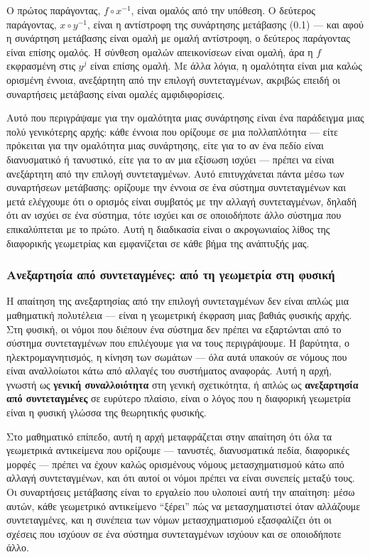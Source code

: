 \documentclass[12pt]{article}
\begin{document}
Ο πρώτος παράγοντας, $f \circ x^{-1}$, είναι ομαλός από την υπόθεση. Ο δεύτερος παράγοντας, $x \circ y^{-1}$, είναι η αντίστροφη της συνάρτησης μετάβασης (0.1) --- και αφού η συνάρτηση μετάβασης είναι ομαλή με ομαλή αντίστροφη, ο δεύτερος παράγοντας είναι επίσης ομαλός. Η σύνθεση ομαλών απεικονίσεων είναι ομαλή, άρα η $f$ εκφρασμένη στις $y^j$ είναι επίσης ομαλή. Με άλλα λόγια, η ομαλότητα είναι μια καλώς ορισμένη έννοια, ανεξάρτητη από την επιλογή συντεταγμένων, ακριβώς επειδή οι συναρτήσεις μετάβασης είναι ομαλές αμφιδιφορίσεις.

Αυτό που περιγράψαμε για την ομαλότητα μιας συνάρτησης είναι ένα παράδειγμα μιας πολύ γενικότερης αρχής: κάθε έννοια που ορίζουμε σε μια πολλαπλότητα --- είτε πρόκειται για την ομαλότητα μιας συνάρτησης, είτε για το αν ένα πεδίο είναι διανυσματικό ή τανυστικό, είτε για το αν μια εξίσωση ισχύει --- πρέπει να είναι ανεξάρτητη από την επιλογή συντεταγμένων. Αυτό επιτυγχάνεται πάντα μέσω των συναρτήσεων μετάβασης: ορίζουμε την έννοια σε ένα σύστημα συντεταγμένων και μετά ελέγχουμε ότι ο ορισμός είναι συμβατός με την αλλαγή συντεταγμένων, δηλαδή ότι αν ισχύει σε ένα σύστημα, τότε ισχύει και σε οποιοδήποτε άλλο σύστημα που επικαλύπτεται με το πρώτο. Αυτή η διαδικασία είναι ο ακρογωνιαίος λίθος της διαφορικής γεωμετρίας και εμφανίζεται σε κάθε βήμα της ανάπτυξής μας.

\subsubsection{Ανεξαρτησία από συντεταγμένες: από τη γεωμετρία στη φυσική}

Η απαίτηση της ανεξαρτησίας από την επιλογή συντεταγμένων δεν είναι απλώς μια μαθηματική πολυτέλεια --- είναι η γεωμετρική έκφραση μιας βαθιάς φυσικής αρχής. Στη φυσική, οι νόμοι που διέπουν ένα σύστημα δεν πρέπει να εξαρτώνται από το σύστημα συντεταγμένων που επιλέγουμε για να τους περιγράψουμε. Η βαρύτητα, ο ηλεκτρομαγνητισμός, η κίνηση των σωμάτων --- όλα αυτά υπακούν σε νόμους που είναι αναλλοίωτοι κάτω από αλλαγές του συστήματος αναφοράς. Αυτή η αρχή, γνωστή ως \textbf{γενική συναλλοιότητα} στη γενική σχετικότητα, ή απλώς ως \textbf{ανεξαρτησία από συντεταγμένες} σε ευρύτερο πλαίσιο, είναι ο λόγος που η διαφορική γεωμετρία είναι η φυσική γλώσσα της θεωρητικής φυσικής.

Στο μαθηματικό επίπεδο, αυτή η αρχή μεταφράζεται στην απαίτηση ότι όλα τα γεωμετρικά αντικείμενα που ορίζουμε --- τανυστές, διανυσματικά πεδία, διαφορικές μορφές --- πρέπει να έχουν καλώς ορισμένους νόμους μετασχηματισμού κάτω από αλλαγή συντεταγμένων, και ότι αυτοί οι νόμοι πρέπει να είναι συνεπείς μεταξύ τους. Οι συναρτήσεις μετάβασης είναι το εργαλείο που υλοποιεί αυτή την απαίτηση: μέσω αυτών, κάθε γεωμετρικό αντικείμενο ``ξέρει'' πώς να μετασχηματιστεί όταν αλλάζουμε συντεταγμένες, και η συνέπεια των νόμων μετασχηματισμού εξασφαλίζει ότι οι σχέσεις που ισχύουν σε ένα σύστημα συντεταγμένων ισχύουν και σε οποιοδήποτε άλλο.
\end{document}
